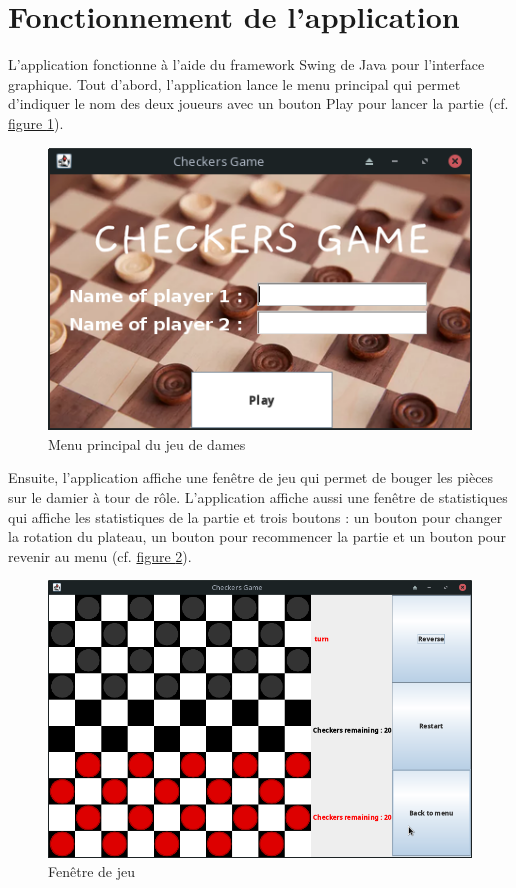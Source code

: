 \section{Fonctionnement de l'application}

L'application fonctionne à l'aide du framework Swing de Java pour l'interface graphique.
Tout d'abord, l'application lance le menu principal qui permet d'indiquer le nom des deux joueurs 
avec un bouton Play pour lancer la partie (cf. \hyperref[f:menuPrincipal]{figure \ref{f:menuPrincipal}}). \medskip

\begin{figure}[H]
    \centering
    \includegraphics[width=0.8\columnwidth]{figures/mainMenu.png}
    \caption[Menu principal du jeu de dames]{Menu principal du jeu de dames}
    \label{f:menuPrincipal}
\end{figure}

Ensuite, l'application affiche une fenêtre de jeu qui permet de bouger les pièces sur le damier à tour de rôle.
L'application affiche aussi une fenêtre de statistiques qui affiche les statistiques de la partie 
et trois boutons : un bouton pour changer la rotation du plateau, un bouton pour recommencer la partie et un bouton 
pour revenir au menu (cf. \hyperref[f:fenetrePrincipale]{figure \ref{f:fenetrePrincipale}}). 

\begin{figure}[H]
    \centering
    \includegraphics[width=1\columnwidth]{figures/boardGame.png}
    \caption[Fenêtre de jeu]{Fenêtre de jeu}
    \label{f:fenetrePrincipale}
\end{figure}

